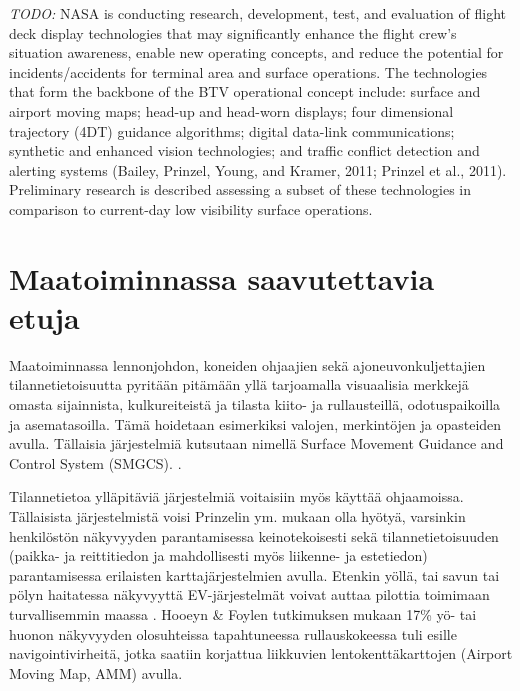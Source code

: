 \documentclass[utf8,bachelor,manualbib]{gradu3}
\begin{document}
\emph{TODO:}
NASA is conducting research, development, test, and evaluation of flight deck display technologies that may significantly enhance the flight crew's situation awareness, enable new operating concepts, and reduce the potential for incidents/accidents for terminal area and surface operations. The technologies that form the backbone of the BTV operational concept include: surface and airport moving maps; head-up and head-worn displays; four dimensional trajectory (4DT) guidance algorithms; digital data-link communications; synthetic and enhanced vision technologies; and traffic conflict detection and alerting systems (Bailey, Prinzel, Young, and Kramer, 2011; Prinzel et al., 2011). Preliminary research is described assessing a subset of these technologies in comparison to current-day low visibility surface operations. \citep{prinzel2013}











































\section{Maatoiminnassa saavutettavia etuja}

Maatoiminnassa lennonjohdon, koneiden ohjaajien sekä ajoneuvonkuljettajien tilannetietoisuutta pyritään pitämään yllä tarjoamalla visuaalisia merkkejä omasta sijainnista, kulkureiteistä ja tilasta kiito- ja rullausteillä, odotuspaikoilla ja asematasoilla. Tämä hoidetaan esimerkiksi valojen, merkintöjen ja opasteiden avulla. Tällaisia järjestelmiä kutsutaan nimellä Surface Movement Guidance and Control System (SMGCS). \citep{prinzel2013}.

Tilannetietoa ylläpitäviä järjestelmiä voitaisiin myös käyttää ohjaamoissa. Tällaisista järjestelmistä voisi Prinzelin ym. \citeyearpar{prinzel2013} mukaan olla hyötyä, varsinkin henkilöstön näkyvyyden parantamisessa keinotekoisesti sekä tilannetietoisuuden (paikka- ja reittitiedon ja mahdollisesti myös liikenne- ja estetiedon) parantamisessa erilaisten karttajärjestelmien avulla. Etenkin yöllä, tai savun tai pölyn haitatessa näkyvyyttä EV-järjestelmät voivat auttaa pilottia toimimaan turvallisemmin maassa \citep{prinzel2013}. Hooeyn \& Foylen \citeyearpar{hooey2007} tutkimuksen mukaan 17\% yö- tai huonon näkyvyyden olosuhteissa tapahtuneessa rullauskokeessa tuli esille navigointivirheitä, jotka saatiin korjattua liikkuvien lentokenttäkarttojen (Airport Moving Map, AMM) avulla.
\end{document}
